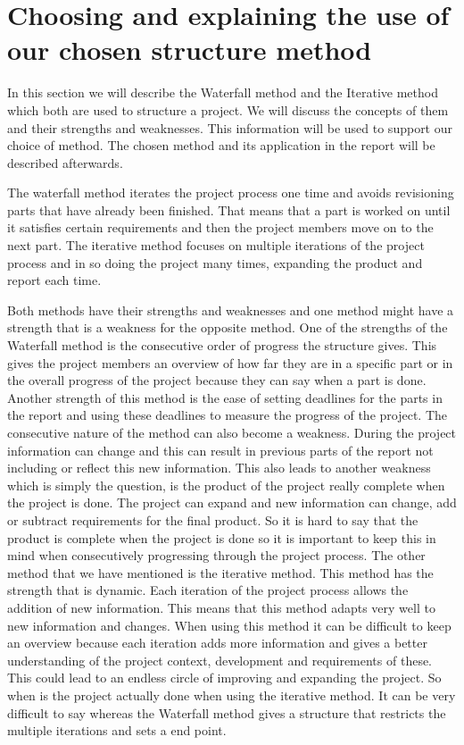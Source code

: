 \section{Choosing and explaining the use of our chosen structure method}

In this section we will describe the Waterfall method and the Iterative method which both are used to structure a project. We will discuss the concepts of them and their strengths and weaknesses. This information will be used to support our choice of method. The chosen method and its application in the report will be described afterwards.

The waterfall method iterates the project process one time and avoids revisioning parts that have already been finished. That means that a part is worked on until it satisfies certain requirements and then the project members move on to the next part. The iterative method focuses on multiple iterations of the project process and in so doing the project many times, expanding the product and report each time.

Both methods have their strengths and weaknesses and one method might have a strength that is a weakness for the opposite method. One of the strengths of the Waterfall method is the consecutive order of progress the structure gives. This gives the project members an overview of how far they are in a specific part or in the overall progress of the project because they can say when a part is done. Another strength of this method is the ease of setting deadlines for the parts in the report and using these deadlines to measure the progress of the project. The consecutive nature of the method can also become a weakness. During the project information can change and this can result in previous parts of the report not including or reflect this new information. This also leads to another weakness which is simply the question, is the product of the project really complete when the project is done. The project can expand and new information can change, add or subtract requirements for the final product. So it is hard to say that the product is complete when the project is done so it is important to keep this in mind when consecutively progressing through the project process. The other method that we have mentioned is the iterative method. This method has the strength that is dynamic. Each iteration of the project process allows the addition of new information. This means that this method adapts very well to new information and changes. When using this method it can be difficult to keep an overview because each iteration adds more information and gives a better understanding of the project context, development and requirements of these. This could lead to an endless circle of improving and expanding the project. So when is the project actually done when using the iterative method. It can be very difficult to say whereas the Waterfall method gives a structure that restricts the multiple iterations and sets a end point. 

